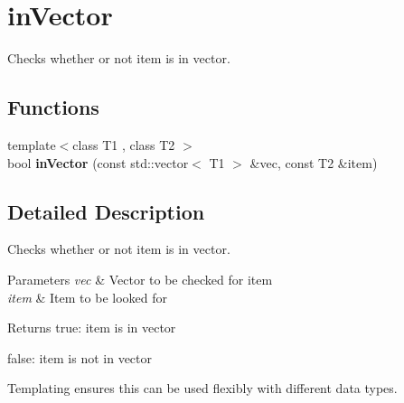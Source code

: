 \hypertarget{group__inVector}{}\section{in\+Vector}
\label{group__inVector}


Checks whether or not item is in vector.  


\subsection*{Functions}
\begin{DoxyCompactItemize}
\item 
\mbox{\label{group__inVector_gac757458344cbb085dcebd2d0c7b9639f}} 
{\footnotesize template$<$class T1 , class T2 $>$ }\\bool {\bfseries in\+Vector} (const std\+::vector$<$ T1 $>$ \&vec, const T2 \&item)
\end{DoxyCompactItemize}


\subsection{Detailed Description}
Checks whether or not item is in vector. 


\begin{DoxyParams}{Parameters}
{\em vec} & Vector to be checked for item \\
\hline
{\em item} & Item to be looked for \\
\hline
\end{DoxyParams}
\begin{DoxyReturn}{Returns}
true\+: item is in vector 

false\+: item is not in vector
\end{DoxyReturn}
Templating ensures this can be used flexibly with different data types. 